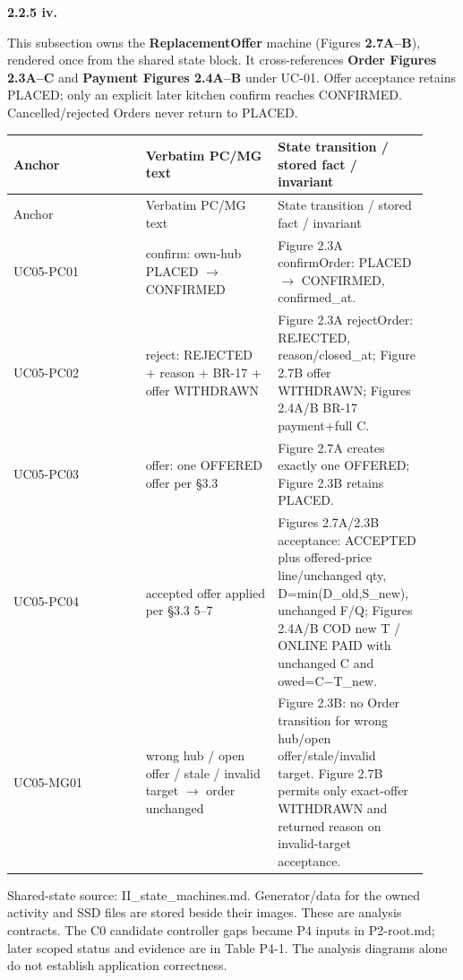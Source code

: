 \textbf{2.2.5 iv.}\par
This subsection owns the \textbf{ReplacementOffer} machine (Figures \textbf{2.7A--B}), rendered once from the shared state block. It cross-references \textbf{Order Figures 2.3A--C} and \textbf{Payment Figures 2.4A--B} under UC-01. Offer acceptance retains PLACED; only an explicit later kitchen confirm reaches CONFIRMED. Cancelled/rejected Orders never return to PLACED.

\begin{longtable}{>{\raggedright\arraybackslash}p{0.3067\linewidth}>{\raggedright\arraybackslash}p{0.3067\linewidth}>{\raggedright\arraybackslash}p{0.3067\linewidth}}
Anchor & Verbatim PC/MG text & State transition / stored fact / invariant \\
\hline\endfirsthead
Anchor & Verbatim PC/MG text & State transition / stored fact / invariant \\
\hline\endhead
UC05-PC01 & confirm: own-hub PLACED \ensuremath{\rightarrow} CONFIRMED & Figure 2.3A confirmOrder: PLACED \ensuremath{\rightarrow} CONFIRMED, confirmed\_at. \\
UC05-PC02 & reject: REJECTED + reason + BR-17 + offer WITHDRAWN & Figure 2.3A rejectOrder: REJECTED, reason/closed\_at; Figure 2.7B offer WITHDRAWN; Figures 2.4A/B BR-17 payment+full C. \\
UC05-PC03 & offer: one OFFERED offer per \S{}3.3 & Figure 2.7A creates exactly one OFFERED; Figure 2.3B retains PLACED. \\
UC05-PC04 & accepted offer applied per \S{}3.3 5--7 & Figures 2.7A/2.3B acceptance: ACCEPTED plus offered-price line/unchanged qty, D=min(D\_old,S\_new), unchanged F/Q; Figures 2.4A/B COD new T / ONLINE PAID with unchanged C and owed=C\ensuremath{-}T\_new. \\
UC05-MG01 & wrong hub / open offer / stale / invalid target \ensuremath{\rightarrow} order unchanged & Figure 2.3B: no Order transition for wrong hub/open offer/stale/invalid target. Figure 2.7B permits only exact-offer WITHDRAWN and returned reason on invalid-target acceptance. \\
\end{longtable}
Shared-state source: II\_state\_machines.md. Generator/data for the owned activity and SSD files are stored beside their images. These are analysis contracts. The C0 candidate controller gaps became P4 inputs in P2-root.md; later scoped status and evidence are in Table P4-1. The analysis diagrams alone do not establish application correctness.

